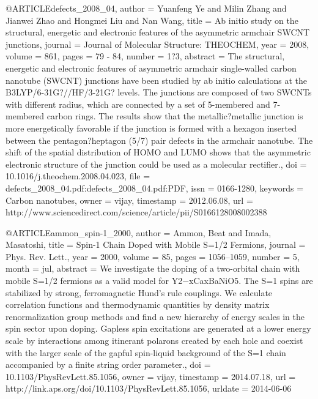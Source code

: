 @ARTICLE{defects_2008_04,
  author = {Yuanfeng Ye and Milin Zhang and Jianwei Zhao and Hongmei Liu and
	Nan Wang},
  title = {Ab initio study on the structural, energetic and electronic features
	of the asymmetric armchair SWCNT junctions},
  journal = {Journal of Molecular Structure: THEOCHEM},
  year = {2008},
  volume = {861},
  pages = {79 - 84},
  number = {1?3},
  abstract = {The structural, energetic and electronic features of asymmetric armchair
	single-walled carbon nanotube (SWCNT) junctions have been studied
	by ab initio calculations at the B3LYP/6-31G?//HF/3-21G? levels.
	The junctions are composed of two SWCNTs with different radius, which
	are connected by a set of 5-membered and 7-membered carbon rings.
	The results show that the metallic?metallic junction is more energetically
	favorable if the junction is formed with a hexagon inserted between
	the pentagon?heptagon (5/7) pair defects in the armchair nanotube.
	The shift of the spatial distribution of HOMO and LUMO shows that
	the asymmetric electronic structure of the junction could be used
	as a molecular rectifier.},
  doi = {10.1016/j.theochem.2008.04.023},
  file = {defects_2008_04.pdf:defects_2008_04.pdf:PDF},
  issn = {0166-1280},
  keywords = {Carbon nanotubes},
  owner = {vijay},
  timestamp = {2012.06.08},
  url = {http://www.sciencedirect.com/science/article/pii/S0166128008002388}
}

@ARTICLE{ammon_spin-1_2000,
  author = {Ammon, Beat and Imada, Masatoshi},
  title = {Spin-1 Chain Doped with Mobile S=1/2 Fermions},
  journal = {Phys. Rev. Lett.},
  year = {2000},
  volume = {85},
  pages = {1056--1059},
  number = {5},
  month = jul,
  abstract = {We investigate the doping of a two-orbital chain with mobile S=1/2
	fermions as a valid model for {Y2−xCaxBaNiO5.} The S=1 spins are
	stabilized by strong, ferromagnetic Hund's rule couplings. We calculate
	correlation functions and thermodynamic quantities by density matrix
	renormalization group methods and find a new hierarchy of energy
	scales in the spin sector upon doping. Gapless spin excitations are
	generated at a lower energy scale by interactions among itinerant
	polarons created by each hole and coexist with the larger scale of
	the gapful spin-liquid background of the S=1 chain accompanied by
	a finite string order parameter.},
  doi = {10.1103/PhysRevLett.85.1056},
  owner = {vijay},
  timestamp = {2014.07.18},
  url = {http://link.aps.org/doi/10.1103/PhysRevLett.85.1056},
  urldate = {2014-06-06}
}

